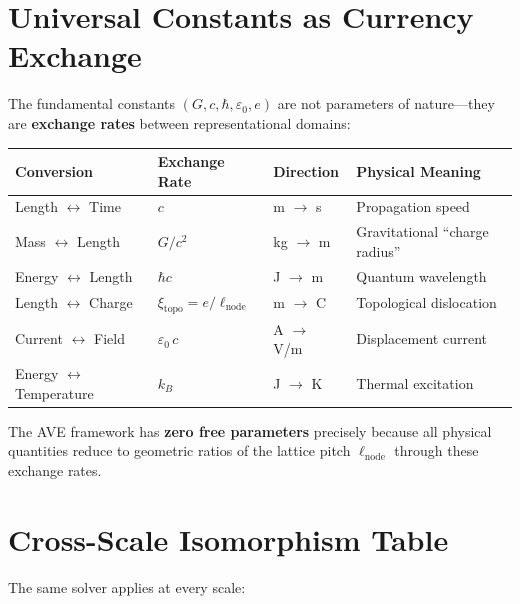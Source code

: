 \section{Universal Constants as Currency Exchange}
\label{sec:currency_exchange}

The fundamental constants $(G, c, \hbar, \varepsilon_0, e)$ are not parameters of nature---they are \textbf{exchange rates} between representational domains:

\begin{center}
\renewcommand{\arraystretch}{1.3}
\begin{tabular}{l l l l}
\toprule
\textbf{Conversion} & \textbf{Exchange Rate} & \textbf{Direction} & \textbf{Physical Meaning} \\
\midrule
Length $\leftrightarrow$ Time & $c$ & m $\to$ s & Propagation speed \\
Mass $\leftrightarrow$ Length & $G/c^2$ & kg $\to$ m & Gravitational ``charge radius'' \\
Energy $\leftrightarrow$ Length & $\hbar c$ & J $\to$ m & Quantum wavelength \\
Length $\leftrightarrow$ Charge & $\xi_\mathrm{topo} = e / \ell_\mathrm{node}$ & m $\to$ C & Topological dislocation \\
Current $\leftrightarrow$ Field & $\varepsilon_0\,c$ & A $\to$ V/m & Displacement current \\
Energy $\leftrightarrow$ Temperature & $k_B$ & J $\to$ K & Thermal excitation \\
\bottomrule
\end{tabular}
\end{center}

\noindent The AVE framework has \textbf{zero free parameters} precisely because all physical quantities reduce to geometric ratios of the lattice pitch $\ell_\mathrm{node}$ through these exchange rates.


\section{Cross-Scale Isomorphism Table}
\label{sec:solver_isomorphism}

The same solver applies at every scale:

